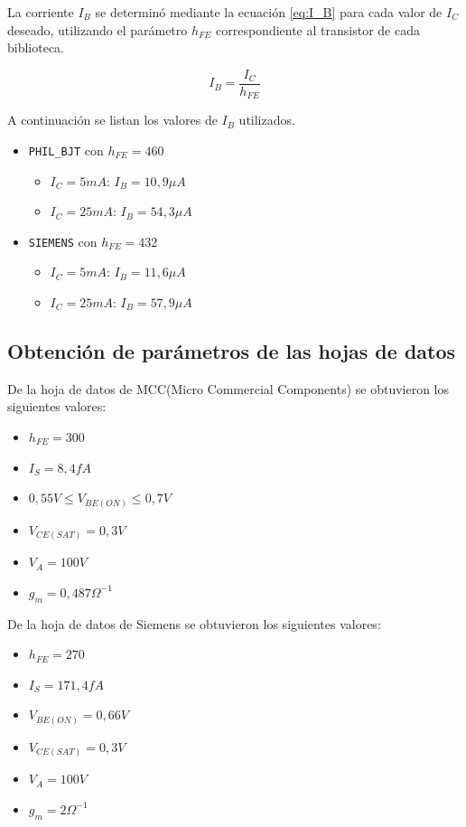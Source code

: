 \documentclass[10pt,spanish,a4paper,openany,notitlepage]{article}
\begin{document}
La corriente $I_B$ se determinó mediante la ecuación \ref{eq:I_B} para cada valor de $I_C$ deseado, utilizando el parámetro $h_{FE}$ correspondiente al transistor de cada biblioteca. 

\begin{equation}
I_B = \frac{I_C}{h_{FE}}
\label{eq:I_B}
\end{equation}

A continuación se listan los valores de $I_B$ utilizados.

\begin{itemize}
\item{\texttt{PHIL\_BJT} con $h_{FE} = 460$}
\begin{itemize}
\item{$I_C = 5 \unit{mA}$}: $I_B = 10,9\unit{\mu A}$
\item{$I_C = 25 \unit{mA}$}: $I_B = 54,3\unit{\mu A}$
\end{itemize}
\item{\texttt{SIEMENS} con $h_{FE} = 432$}
\begin{itemize}
\item{$I_C = 5 \unit{mA}$}: $I_B = 11,6\unit{\mu A}$
\item{$I_C = 25 \unit{mA}$}: $I_B = 57,9\unit{\mu A}$
\end{itemize}
\end{itemize}

\subsection{Obtención de parámetros de las hojas de datos}

De la hoja de datos de MCC(Micro Commercial Components) se obtuvieron los siguientes valores:

\begin{itemize}
\item $h_{FE} =300 $
\item $I_S = 8,4 \unit{fA}$
\item $0,55 \unit{V} \leq V_{BE(ON)} \leq 0,7 \unit{V}$
\item $V_{CE(SAT)} = 0,3 \unit{V}$
\item $V_A = 100 \unit{V}$
\item $g_m = 0,487 \Omega^{-1}$
\end{itemize}

De la hoja de datos de Siemens se obtuvieron los siguientes valores:

\begin{itemize}
\item $h_{FE} =270$
\item $I_S = 171,4 \unit{fA}$
\item $V_{BE(ON)} = 0,66\unit{V}$
\item $V_{CE(SAT)} = 0,3 \unit{V}$
\item $V_A = 100 \unit{V}$
\item $g_m = 2 \Omega^{-1}$
\end{itemize}
\end{document}
